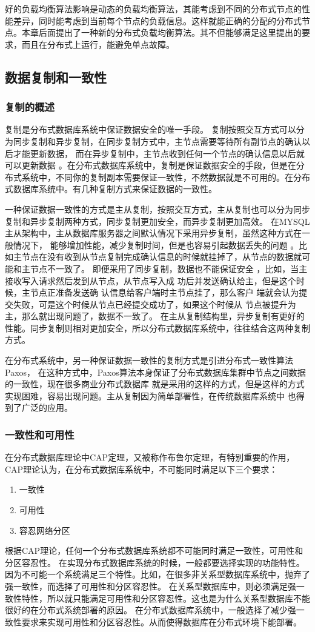 	好的负载均衡算法影响是动态的负载均衡算法，其能考虑到不同的分布式节点的性能差异，同时能考虑到当前每个节点的负载信息。这样就能正确的分配的分布式节点。本章后面提出了一种新的分布式负载均衡算法。其不但能够满足这里提出的要求，而且在分布式上运行，能避免单点故障。
\subsection{数据复制和一致性}
\subsubsection{复制的概述}
复制是分布式数据库系统中保证数据安全的唯一手段。
复制按照交互方式可以分为同步复制和异步复制，在同步复制方式中，主节点需要等待所有副节点的确认以后才能更新数据，
而在异步复制中，主节点收到任何一个节点的确认信息以后就可以更新数据
。在分布式数据库系统中，复制是保证数据安全的手段，但是在分布式系统中，不同你的复制副本需要保证一致性，不然数据就是不可用的。在分布式数据库系统中。有几种复制方式来保证数据的一致性。



一种保证数据一致性的方式是主从复制，按照交互方式，主从复制也可以分为同步复制和异步复制两种方式，同步复制更加安全，而异步复制更加高效。
在MYSQL主从架构中，主从数据库服务器之间默认情况下采用异步复制，虽然这种方式在一般情况下，
能够增加性能，减少复制时间，但是也容易引起数据丢失的问题
。比如主节点在没有收到从节点复制完成确认信息的时候就挂掉了，从节点的数据就可能和主节点不一致了。
即便采用了同步复制，数据也不能保证安全
，比如，当主接收写入请求然后发到从节点，从节点写入成
功后并发送确认给主，但是这个时候，主节点正准备发送确
认信息给客户端时主节点挂了，那么客户
端就会认为提交失败，可是这个时候从节点已经提交成功了，如果这个时候从
节点被提升为主，那么就出现问题了，数据不一致了。
在主从复制结构里，异步复制有更好的性能。同步复制则相对更加安全，所以分布式数据库系统中，往往结合这两种复制方式。

在分布式系统中，另一种保证数据一致性的复制方式是引进分布式一致性算法Paxos，
在这种方式中，Paxos算法本身保证了分布式数据库集群中节点之间数据的一致性，现在很多商业分布式数据库
就是采用的这样的方式，但是这样的方式实现困难，容易出现问题。主从复制因为简单部署性，在传统数据库系统中
也得到了广泛的应用。
\subsubsection{一致性和可用性}
在分布式数据库理论中CAP定理，又被称作布鲁尔定理，有特别重要的作用，
CAP理论认为，在分布式数据库系统中，不可能同时满足以下三个要求：
\begin{enumerate}
	\item 一致性
	\item 可用性
	\item 容忍网络分区
\end{enumerate}
根据CAP理论，任何一个分布式数据库系统都不可能同时满足一致性，可用性和分区容忍性。
在实现分布式数据库系统的时候，一般都要选择实现的功能特性。
因为不可能一个系统满足三个特性。比如，在很多非关系型数据库系统中，抛弃了强一致性，而选择了可用性和分区容忍性。
在关系型数据库中，则必须满足强一致性特性，所以就只能满足可用性和分区容忍性。这也是为什么关系型数据库不能很好的在分布式系统部署的原因。
在分布式数据库系统中，一般选择了减少强一致性要求来实现可用性和分区容忍性。从而使得数据库在分布式环境下能部署。
